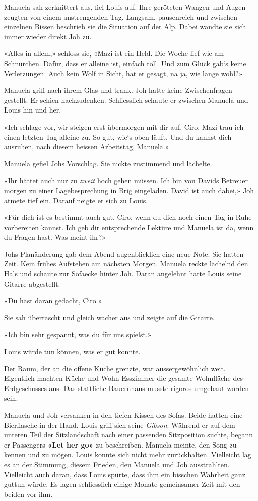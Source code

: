 Manuela sah zerknittert aus, fiel Louis auf. Ihre geröteten Wangen und
Augen zeugten von einem anstrengenden Tag. Langsam, pausenreich und
zwischen einzelnen Bissen beschrieb sie die Situation auf der Alp. Dabei
wandte sie sich immer wieder direkt Joh zu.

«Alles in allem,» schloss sie, «Mazi ist ein Held. Die Woche lief wie am
Schnürchen. Dafür, dass er alleine ist, einfach toll. Und zum Glück
gab`s keine Verletzungen. Auch kein Wolf in Sicht, hat er gesagt, na ja,
wie lange wohl?»

Manuela griff nach ihrem Glas und trank. Joh hatte keine Zwischenfragen
gestellt. Er schien nachzudenken. Schliesslich schaute er zwischen
Manuela und Louis hin und her.

«Ich schlage vor, wir steigen erst übermorgen mit dir auf, Ciro. Mazi
trau ich einen letzten Tag alleine zu. So gut, wie`s oben läuft. Und du
kannst dich ausruhen, nach diesem heissen Arbeitstag, Manuela.»

Manuela gefiel Johs Vorschlag. Sie nickte zustimmend und lächelte.

«Ihr hättet auch nur zu \emph{zweit} hoch gehen müssen. Ich bin von
Davids Betreuer morgen zu einer Lagebesprechung in Brig eingeladen.
David ist auch dabei,» Joh atmete tief ein. Darauf neigte er sich zu
Louis.

«Für dich ist es bestimmt auch gut, Ciro, wenn du dich noch einen Tag in
Ruhe vorbereiten kannst. Ich geb dir entsprechende Lektüre und Manuela
ist da, wenn du Fragen hast. Was meint ihr?»

Johs Planänderung gab dem Abend augenblicklich eine neue Note. Sie
hatten Zeit. Kein frühes Aufstehen am nächsten Morgen. Manuela reckte
lächelnd den Hals und schaute zur Sofaecke hinter Joh. Daran angelehnt
hatte Louis seine Gitarre abgestellt.

«Du hast daran gedacht, Ciro.»

Sie sah überrascht und gleich wacher aus und zeigte auf die Gitarre.

«Ich bin sehr gespannt, was du für uns spielst.»

Louis würde tun können, was er gut konnte.

Der Raum, der an die offene Küche grenzte, war aussergewöhnlich weit.
Eigentlich machten Küche und Wohn-Esszimmer die gesamte Wohnfläche des
Erdgeschosses aus. Das stattliche Bauernhaus musste rigoros umgebaut
worden sein.

Manuela und Joh versanken in den tiefen Kissen des Sofas. Beide hatten
eine Bierflasche in der Hand. Louis griff sich seine \emph{Gibson}.
Während er auf dem unteren Teil der Sitzlandschaft nach einer passenden
Sitzposition suchte, begann er Passengers \textbf{«Let her go»} zu
beschreiben. Manuela meinte, den Song zu kennen und zu mögen. Louis
konnte sich nicht mehr zurückhalten. Vielleicht lag es an der Stimmung,
diesem Frieden, den Manuela und Joh ausstrahlten. Vielleicht auch daran,
dass Louis spürte, dass ihm ein bisschen Wahrheit ganz guttun würde. Es
lagen schliesslich einige Monate gemeinsamer Zeit mit den beiden vor
ihm.

